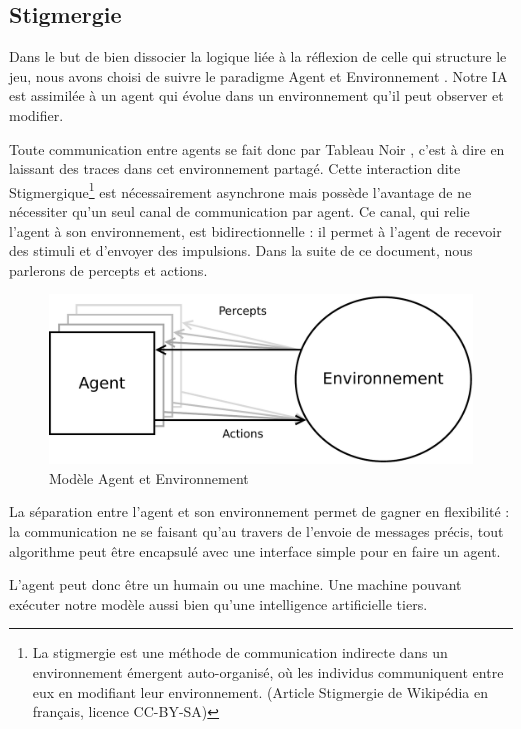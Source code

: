 \subsection{ \og Stigmergie \fg{} }

Dans le but de bien dissocier la logique liée à la réflexion de celle qui structure le jeu, nous avons choisi de suivre le paradigme \og Agent et Environnement \fg{}. Notre IA est assimilée à un agent qui évolue dans un environnement qu'il peut observer et modifier.

Toute communication entre agents se fait donc par \og Tableau Noir \fg{}, c'est à dire en laissant des traces dans cet environnement partagé. Cette interaction dite \og Stigmergique\footnote{La stigmergie est une méthode de communication indirecte dans un environnement émergent auto-organisé, où les individus communiquent entre eux en modifiant leur environnement. (Article \og Stigmergie \fg{} de Wikipédia en français, licence CC-BY-SA)} \fg{} est nécessairement asynchrone mais possède l'avantage de ne nécessiter qu'un seul canal de communication par agent. Ce canal, qui relie l'agent à son environnement, est bidirectionnelle : il permet à l'agent de recevoir des stimuli et d'envoyer des impulsions. Dans la suite de ce document, nous parlerons de \og percepts\fg{} et \og actions\fg{}.

\begin{figure}[H] 
\centering
\includegraphics[width=\textwidth]{files/env/agent_env} 
\caption{Modèle \og Agent et Environnement \fg{}} 
\label{agent_env}
\end{figure}

La séparation entre l'agent et son environnement permet de gagner en flexibilité : la communication ne se faisant qu'au travers de l'envoie de messages précis, tout algorithme peut être encapsulé avec une interface simple pour en faire un agent.

L'agent peut donc être un humain ou une machine. Une machine pouvant exécuter notre modèle aussi bien qu'une intelligence artificielle tiers. 

